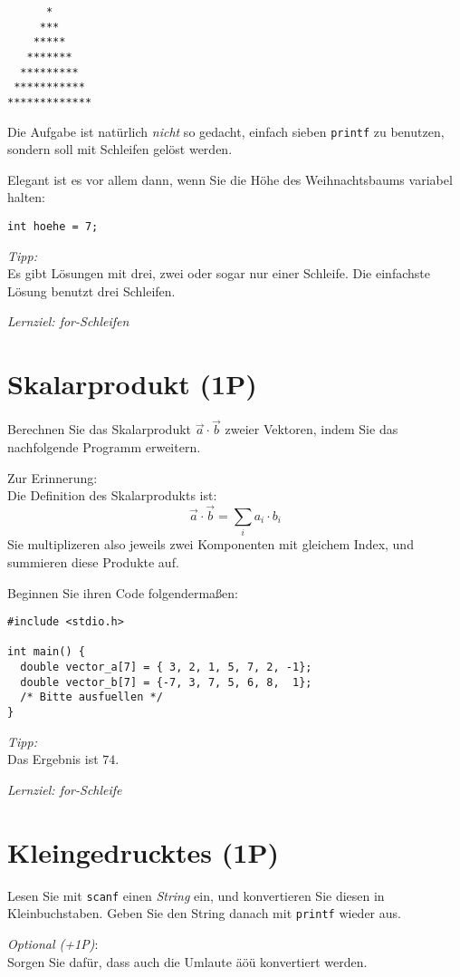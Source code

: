 \documentclass[
	ngerman,
	fontsize=10pt,
	parskip=half,
	titlepage=true,
	DIV=12
]{scrartcl}
\begin{document}
\begin{verbatim}
      *
     ***
    *****
   *******
  *********
 ***********
*************
\end{verbatim}

Die Aufgabe ist natürlich \emph{nicht} so gedacht, einfach sieben \texttt{printf} zu benutzen, sondern soll mit Schleifen gelöst werden.

Elegant ist es vor allem dann, wenn Sie die Höhe des Weihnachtsbaums variabel halten:

\texttt{int hoehe = 7;}

\emph{Tipp:}\\
Es gibt Lösungen mit drei, zwei oder sogar nur einer Schleife. Die einfachste Lösung benutzt drei Schleifen.

\emph{Lernziel: for-Schleifen}


\section{Skalarprodukt (1P)}
Berechnen Sie das Skalarprodukt $\vec a \cdot \vec b$ zweier Vektoren, indem Sie das nachfolgende Programm erweitern.

Zur Erinnerung:\\
Die Definition des Skalarprodukts ist:
%
\[ \vec a \cdot \vec b = \sum_i a_i \cdot b_i \]
%
Sie multiplizeren also jeweils zwei Komponenten mit gleichem Index, und summieren diese Produkte auf.

Beginnen Sie ihren Code folgendermaßen:
\begin{verbatim}
#include <stdio.h>

int main() {
  double vector_a[7] = { 3, 2, 1, 5, 7, 2, -1};
  double vector_b[7] = {-7, 3, 7, 5, 6, 8,  1};
  /* Bitte ausfuellen */
}
\end{verbatim}

\emph{Tipp:}\\
Das Ergebnis ist $74$.

\emph{Lernziel: for-Schleife}


\section{Kleingedrucktes (1P)}
Lesen Sie mit \texttt{scanf} einen {\em String} ein, und konvertieren Sie diesen in Kleinbuchstaben. Geben Sie den String danach mit \texttt{printf} wieder aus.

\emph{Optional (+1P)}:\\
Sorgen Sie dafür, dass auch die Umlaute äöü konvertiert werden.
\end{document}
